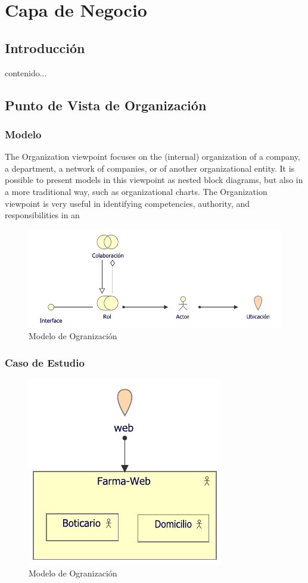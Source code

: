\chapter{Capa de Negocio}
\section{Introducción}
contenido...
\newpage
\section{Punto de Vista de Organización}
\subsection{Modelo}
The Organization viewpoint focuses on the (internal) organization of a company, a department, a network of companies, or of another organizational entity. It is possible to present models in this viewpoint as nested block diagrams, but also in a more traditional way, such as organizational charts. The Organization viewpoint is very useful in identifying competencies, authority, and responsibilities in an

\begin{figure}[h!]
	\centering
	\includegraphics[width=1\linewidth]{ARQUITECTURA/imgs/MOrganizacion}
	\caption{Modelo de Ogranización}
\end{figure}


\newpage
\subsection{Caso de Estudio}

\begin{figure}[h!]
	\centering
	\includegraphics[width=.5\linewidth]{ARQUITECTURA/imgs/COrganizacion}
	\caption{Modelo de Ogranización}
\end{figure}

